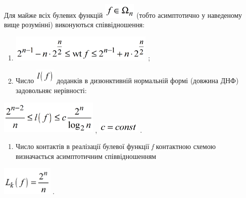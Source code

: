 Для майже всіх булевих функцій 
\includegraphics[width=0.611in,height=0.2874in]{crypt-img/crypt-img171.png} 
(тобто асимптотично у наведеному вище розумінні) виконуються співвідношення:

\liststyleWWviiiNumvi
\begin{enumerate}
\item 
\includegraphics[width=2.7366in,height=0.5008in]{crypt-img/crypt-img172.png} ;
\item Число 
\includegraphics[width=0.3819in,height=0.2945in]{crypt-img/crypt-img173.png} 
доданків в диз{\textquotesingle}юнктивній нормальній формі (довжина ДНФ)
задовольняє нерівності:
\end{enumerate}
{\centering
 \includegraphics[width=1.8701in,height=0.6311in]{crypt-img/crypt-img174.png} , 
\includegraphics[width=0.8083in,height=0.2071in]{crypt-img/crypt-img175.png} .
\par}

\liststyleWWviiiNumvi
\setcounter{saveenum}{\value{enumi}}
\begin{enumerate}
\setcounter{enumi}{\value{saveenum}}
\item Число контактів в реалізації булевої функції \textit{f }контактною схемою
визначається асимптотичним співвідношенням
\end{enumerate}
{\centering
 \includegraphics[width=0.9752in,height=0.552in]{crypt-img/crypt-img176.png} .
\par}

